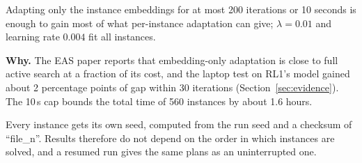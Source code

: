 \begin{assumption}\label{as:eas}
Adapting only the instance embeddings for at most 200 iterations or 10 seconds is enough to gain most of what per-instance adaptation can give; $\lambda=0.01$ and learning rate $0.004$ fit all instances.

\textbf{Why.} The EAS paper reports that embedding-only adaptation is close to full active search at a fraction of its cost, and the laptop test on RL1's model gained about 2 percentage points of gap within 30 iterations (Section~\ref{sec:evidence}). The 10\,s cap bounds the total time of 560 instances by about 1.6 hours.
\end{assumption}

\begin{assumption}[Reproducibility]\label{as:seed}
Every instance gets its own seed, computed from the run seed and a checksum of ``file\_n''. Results therefore do not depend on the order in which instances are solved, and a resumed run gives the same plans as an uninterrupted one.
\end{assumption}
